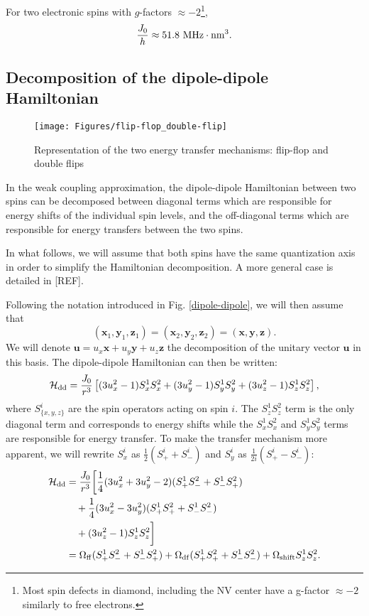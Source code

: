 \documentclass[a4paper,11pt]{report}
\begin{document}
For two electronic spins with $g$-factors $\approx -2$\footnote{Most spin defects in diamond, including the NV center have a g-factor $\approx -2$ similarly to free electrons.}, 
\begin{equation*}
\frac{J_0}{h} \approx 51.8\ \rm{MHz}\cdot \rm{nm}^3.
\end{equation*}

\subsection{Decomposition of the dipole-dipole Hamiltonian}

\begin{figure}[h!]
\centering
\texttt{[image: Figures/flip-flop\_double-flip]}
\caption{Representation of the two energy transfer mechanisms: flip-flop and double flips} 
\label{flip flop double flip}
\end{figure}

In the weak coupling approximation, the dipole-dipole Hamiltonian between two spins can be decomposed between diagonal terms which are responsible for energy shifts of the individual spin levels, and the off-diagonal terms which are responsible for energy transfers between the two spins.

In what follows, we will assume that both spins have the same quantization axis in order to simplify the Hamiltonian decomposition. A more general case is detailed in [REF].

Following the notation introduced in Fig. \ref{dipole-dipole}, we will then assume that $$(\mathbf{x}_1,\mathbf{y}_1,\mathbf{z}_1) = (\mathbf{x}_2,\mathbf{y}_2,\mathbf{z}_2) = (\mathbf{x},\mathbf{y},\mathbf{z}).$$ We will denote $\mathbf{u}=u_x \mathbf{x} + u_y \mathbf{y} + u_z \mathbf{z}$ the decomposition of the unitary vector $\mathbf{u}$ in this basis. The dipole-dipole Hamiltonian can then be written:
\begin{equation}
\mathcal{H}_{\rm dd}=\frac{J_0}{r^3}\left[ (3 u_x^2-1) S_x^1 S_x^2 + (3 u_y^2-1) S_y^1 S_y^2 + (3 u_z^2-1) S_z^1 S_z^2 \right],
\end{equation}
where $S_{\{x,y,z\} }^i$ are the spin operators acting on spin $i$. The $S_z^1 S_z^2$ term is the only diagonal term and corresponds to energy shifts while the $S_x^1 S_x^2$ and $S_y^1 S_y^2$ terms are responsible for energy transfer. To make the transfer mechanism more apparent, we will rewrite $S_x^i$ as $\frac{1}{2}(S_+^i+S_-^i)$ and $S_y^i$ as $\frac{1}{2i}(S_+^i-S_-^i)$:
\begin{align}
\mathcal{H}_{\rm dd}&=\frac{J_0}{r^3}\bigg{[} \frac{1}{4}(3 u_x^2 + 3 u_y^2 -2)(S_+^1 S_-^2 + S_-^1 S_+^2) \nonumber \\
&\quad + \frac{1}{4}(3 u_x^2 - 3 u_y^2)(S_+^1 S_+^2 + S_-^1 S_-^2) \nonumber \\
&\quad +(3 u_z^2-1) S_z^1 S_z^2 \bigg{]} \\
\medskip
&= \Omega_{\rm ff} (S_+^1 S_-^2 + S_-^1 S_+^2) + \Omega_{\rm df} (S_+^1 S_+^2 + S_-^1 S_-^2) + \Omega_{\rm shift} S_z^1 S_z^2. \label{eq. ff df}
\end{align}
\end{document}
